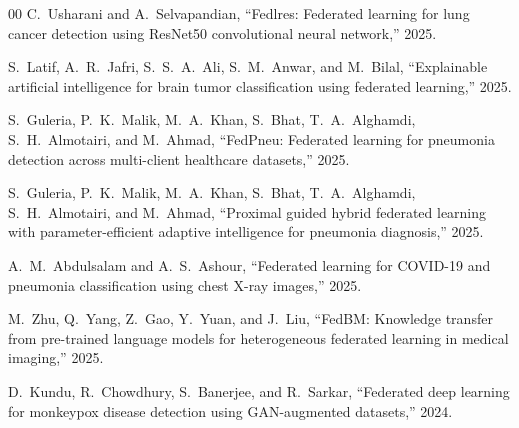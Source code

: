 \documentclass[journal]{IEEEtran}
\begin{document}
\begin{thebibliography}{00}
C.~Usharani and A.~Selvapandian, ``Fedlres: Federated learning for lung cancer detection using ResNet50 convolutional neural network,'' 2025.

S.~Latif, A.~R.~Jafri, S.~S.~A.~Ali, S.~M.~Anwar, and M.~Bilal, ``Explainable artificial intelligence for brain tumor classification using federated learning,'' 2025.

S.~Guleria, P.~K.~Malik, M.~A.~Khan, S.~Bhat, T.~A.~Alghamdi, S.~H.~Almotairi, and M.~Ahmad, ``FedPneu: Federated learning for pneumonia detection across multi-client healthcare datasets,'' 2025.

S.~Guleria, P.~K.~Malik, M.~A.~Khan, S.~Bhat, T.~A.~Alghamdi, S.~H.~Almotairi, and M.~Ahmad, ``Proximal guided hybrid federated learning with parameter-efficient adaptive intelligence for pneumonia diagnosis,'' 2025.

A.~M.~Abdulsalam and A.~S.~Ashour, ``Federated learning for COVID-19 and pneumonia classification using chest X-ray images,'' 2025.

M.~Zhu, Q.~Yang, Z.~Gao, Y.~Yuan, and J.~Liu, ``FedBM: Knowledge transfer from pre-trained language models for heterogeneous federated learning in medical imaging,'' 2025.

D.~Kundu, R.~Chowdhury, S.~Banerjee, and R.~Sarkar, ``Federated deep learning for monkeypox disease detection using GAN-augmented datasets,'' 2024.

\end{thebibliography}
\end{document}

